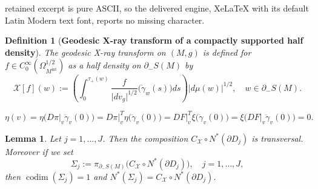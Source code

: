 \documentclass[10pt,a4paper]{amsart}
\newtheorem{definition}[theorem]{Definition}
\newtheorem{lemma}[theorem]{Lemma}
\begin{document}
retained excerpt is pure ASCII, so the delivered engine, XeLaTeX with its default Latin Modern text font, reports no missing character.
\begin{definition}[{\bf Geodesic X-ray transform of a compactly supported half density}] 
\label{theorem:geodesicxraytransform}
The geodesic X-ray transform on $(M,g)$ is defined for $f \in C^\infty_0(\Omega_{M^\text{int}}^{1/2})$ as a half density on $\partial_-S(M)$ by 
%
%
\begin{equation}
\mathcal{X}[f](w)
:=
\left(
\int_0^{\tau_+(w)}
\frac{f}{\lvert{dv_g}\rvert^{1/2}}
\bigl(\dot{\gamma}_w(s)\bigr)
ds
\right)
\lvert{d\mu(w)}\rvert^{1/2},
\quad
w \in \partial_-S(M). 
\label{equation:geodesicxraytransform} 
\end{equation}
%
%
\end{definition} 

\begin{equation}
\eta(v)
=
\eta\bigl(D\pi\vert_v\ddot{\gamma}_v(0)\bigr)
=
D\pi\vert^T_v\eta\bigl(\ddot{\gamma}_v(0)\bigr)
=
DF\vert^T_v\xi\bigl(\ddot{\gamma}_v(0)\bigr)
=
\xi\bigl(DF\vert_v\ddot{\gamma}_v(0)\bigr)
=
0. 
\label{equation:etav}
\end{equation}

\begin{lemma}
\label{theorem:4-1}
Let $j=1,\dotsc,J$. 
Then the composition $C_\mathcal{X}{\circ}N^\ast(\partial{D_j})$  is transversal. 
Moreover if we set 
%
%
$$
\Sigma_j
:=
\pi_{\partial_-S(M)}
\bigl(C_\mathcal{X}{\circ}N^\ast(\partial{D_j})\bigr), 
\quad
j=1,\dotsc,J,
$$
%
%
then $\operatorname{codim}(\Sigma_j)=1$ and $N^\ast(\Sigma_j)=C_\mathcal{X}{\circ}N^\ast(\partial{D_j})$. 
\end{lemma} 
\end{document}
